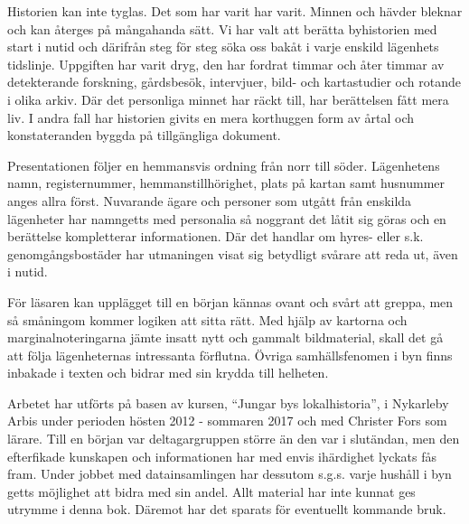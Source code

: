 

Historien kan inte tyglas. Det som har varit har varit. Minnen och hävder bleknar och kan återges på mångahanda sätt. Vi har valt att berätta byhistorien med start i nutid och därifrån steg för steg söka oss bakåt i varje enskild lägenhets tidslinje. Uppgiften har varit dryg, den har fordrat timmar och åter timmar av detekterande forskning, gårdsbesök, intervjuer, bild- och kartastudier och rotande i olika arkiv. Där det personliga minnet har räckt till, har berättelsen fått mera liv. I andra fall har historien givits en mera korthuggen form av årtal och konstateranden byggda på tillgängliga dokument.

Presentationen följer en hemmansvis ordning från norr till söder. Lägenhetens namn, registernummer, hemmanstillhörighet, plats på kartan samt husnummer anges allra först. Nuvarande ägare och personer som utgått från enskilda lägenheter har namngetts med personalia så noggrant det låtit sig göras och en berättelse kompletterar informationen. Där det handlar om hyres- eller s.k. genomgångsbostäder har utmaningen visat sig betydligt svårare att reda ut, även i nutid.

För läsaren kan upplägget till en början kännas ovant och svårt att greppa, men så småningom kommer logiken att sitta rätt. Med hjälp av kartorna och marginalnoteringarna jämte insatt nytt och gammalt bildmaterial, skall det gå att följa lägenheternas intressanta förflutna. Övriga samhällsfenomen i byn finns inbakade i texten och bidrar med sin krydda till helheten.

Arbetet har utförts på basen av kursen, ``Jungar bys lokalhistoria'', i Nykarleby Arbis under perioden hösten 2012 - sommaren 2017 och med Christer Fors som lärare. Till en början var deltagargruppen större än den var i slutändan, men den efterfikade kunskapen och informationen har med envis ihärdighet lyckats fås fram. Under jobbet med datainsamlingen har dessutom s.g.s. varje hushåll i byn getts möjlighet att bidra med sin andel. Allt material har inte kunnat ges utrymme i denna bok. Däremot har det sparats för eventuellt kommande bruk.

